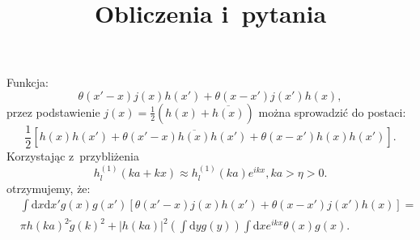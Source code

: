\documentclass[a4paper,11pt]{article}
\title{Obliczenia i~pytania}
\author{}
\newcommand{\de}{\mathrm{d}}
\begin{document}
\noindent
Funkcja:
\begin{displaymath}
\theta( x' - x ) j( x ) h( x' ) + \theta( x - x' ) j( x' ) h( x ),
\end{displaymath}
przez podstawienie $j( x ) = \tfrac{ 1 }{ 2 }( h( x ) + \overline{ h( x ) } )$ można sprowadzić do postaci:
\begin{displaymath}
\frac{ 1 }{ 2 } [ h( x ) h( x' ) + \theta( x' - x ) \overline{ h( x ) } h( x' ) + \theta( x - x' ) h( x ) h( x' ) ].
\end{displaymath}
Korzystając z~przybliżenia
\begin{displaymath}
h^{ ( 1 ) }_{ l }( k a + kx ) \approx h^{ ( 1 ) }_{ l }( k a ) e^{ i k x }, ka > \eta > 0.
\end{displaymath}
otrzymujemy, że:
\begin{equation}
\begin{split}
& \int \de x \de x' g( x ) g( x' ) [\theta( x' - x ) j( x ) h( x' ) + \theta( x - x' ) j( x' ) h( x )] = \\
& \pi h( k a )^{ 2 } \widetilde{ g }( k )^{ 2 } + | h( k a ) |^{ 2 } \left( \int \de y g( y ) \right) \int \de x e^{ ikx } \theta( x ) g( x ).
\end{split}
\end{equation}
\end{document}
